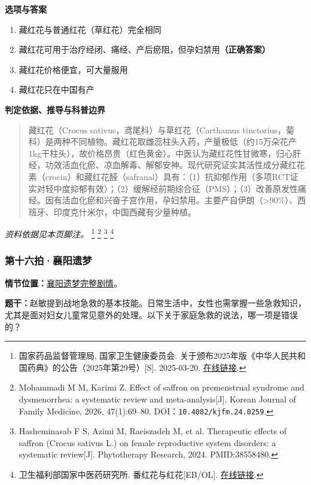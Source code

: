 \textbf{选项与答案}
\begin{enumerate}[label=\Alph*.,leftmargin=*]
  \item 藏红花与普通红花（草红花）完全相同
  \item 藏红花可用于治疗经闭、痛经、产后瘀阻，但孕妇禁用\textbf{（正确答案）}
  \item 藏红花价格便宜，可大量服用
  \item 藏红花只在中国有产
\end{enumerate}
\textbf{判定依据、推导与科普边界}
\begin{quote}藏红花（Crocus sativus，鸢尾科）与草红花（Carthamus tinctorius，菊科）是两种不同植物。藏红花取雌蕊柱头入药，产量极低（约15万朵花产1kg干柱头），故价格昂贵（红色黄金）。中医认为藏红花性甘微寒，归心肝经，功效活血化瘀、凉血解毒、解郁安神。现代研究证实其活性成分藏红花素（crocin）和藏红花醛（safranal）具有：（1）抗抑郁作用（多项RCT证实对轻中度抑郁有效）；（2）缓解经前期综合征（PMS）；（3）改善原发性痛经。因有活血化瘀和兴奋子宫作用，孕妇禁用。主要产自伊朗（>90\%）、西班牙、印度克什米尔，中国西藏有少量种植。\end{quote}
\noindent\textit{资料依据见本页脚注。}
\footnote{国家药品监督管理局, 国家卫生健康委员会. 关于颁布2025年版《中华人民共和国药典》的公告（2025年第29号）[S]. 2025-03-20. \href{https://www.nmpa.gov.cn/xxgk/fgwj/gzwj/gzwjyp/20250325183810122.html}{在线链接}.}
\footnote{Mohammadi M M, Karimi Z. Effect of saffron on premenstrual syndrome and dysmenorrhea: a systematic review and meta-analysis[J]. Korean Journal of Family Medicine, 2026, 47(1):69–80. DOI：\nolinkurl{10.4082/kjfm.24.0259}.}
\footnote{Hasheminasab F S, Azimi M, Raeiszadeh M, et al. Therapeutic effects of saffron (Crocus sativus L.) on female reproductive system disorders: a systematic review[J]. Phytotherapy Research, 2024. PMID:38558480.}
\footnote{卫生福利部国家中医药研究所. 番红花与红花[EB/OL]. \href{https://www.nricm.edu.tw/p/404-1000-5146.php?Lang=zh-tw}{在线链接}.}

\subsubsection{第十六拍·襄阳遗梦}\label{question:zhaomin:16}
\textbf{情节位置：}\hyperref[plot:zhaomin:16]{襄阳遗梦完整剧情}。

\textbf{题干：}赵敏提到战地急救的基本技能。日常生活中，女性也需掌握一些急救知识，尤其是面对妇女儿童常见意外的处理。以下关于家庭急救的说法，哪一项是错误的？

